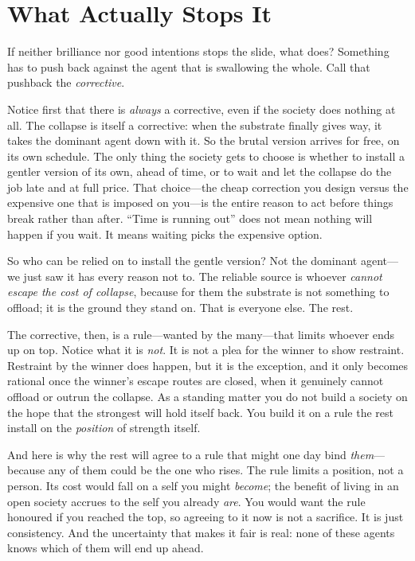 \documentclass[11pt, a4paper]{report}
\begin{document}

\section{What Actually Stops It}

If neither brilliance nor good intentions stops the slide, what does? Something has to push back against the agent that is swallowing the whole. Call that pushback the \textit{corrective}.

Notice first that there is \textit{always} a corrective, even if the society does nothing at all. The collapse is itself a corrective: when the substrate finally gives way, it takes the dominant agent down with it. So the brutal version arrives for free, on its own schedule. The only thing the society gets to choose is whether to install a gentler version of its own, ahead of time, or to wait and let the collapse do the job late and at full price. That choice---the cheap correction you design versus the expensive one that is imposed on you---is the entire reason to act before things break rather than after. \enquote{Time is running out} does not mean nothing will happen if you wait. It means waiting picks the expensive option.

So who can be relied on to install the gentle version? Not the dominant agent---we just saw it has every reason not to. The reliable source is whoever \textit{cannot escape the cost of collapse}, because for them the substrate is not something to offload; it is the ground they stand on. That is everyone else. The rest.

The corrective, then, is a rule---wanted by the many---that limits whoever ends up on top. Notice what it is \textit{not}. It is not a plea for the winner to show restraint. Restraint by the winner does happen, but it is the exception, and it only becomes rational once the winner's escape routes are closed, when it genuinely cannot offload or outrun the collapse. As a standing matter you do not build a society on the hope that the strongest will hold itself back. You build it on a rule the rest install on the \textit{position} of strength itself.

And here is why the rest will agree to a rule that might one day bind \textit{them}---because any of them could be the one who rises. The rule limits a position, not a person. Its cost would fall on a self you might \textit{become}; the benefit of living in an open society accrues to the self you already \textit{are}. You would want the rule honoured if you reached the top, so agreeing to it now is not a sacrifice. It is just consistency. And the uncertainty that makes it fair is real: none of these agents knows which of them will end up ahead.
\end{document}
